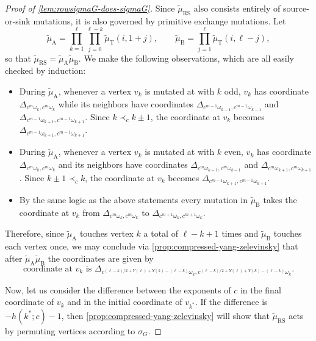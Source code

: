 \documentclass{amsart}
\theoremstyle{plain}
\theoremstyle{definition}
\theoremstyle{remark}
\newcommand{\fundamentalweight}{\omega}
\newcommand{\genminoryz}[3]{\Delta_{{#1} \fundamentalweight_{#3}, {#2}%
    \fundamentalweight_{#3}}}
\newcommand{\muint}[1]{\widetilde{\mu}_{\text{#1}}}
\newcommand{\murowperm}{\muint{RS}}
\newcommand{\muT}{\muint{T}}
\begin{document}
\begin{proof}[Proof of \cref{lem:rowsigmaG-does-sigmaG}]
    Since $\murowperm$ also consists entirely of source-or-sink
    mutations, it is also governed by primitive exchange mutations. Let
    \[ \muint{A} = \prod_{k=1}^{\ell} \prod_{j=0}^{\ell - k} \muT(i, 1 +
      j), \qquad \muint{B} = \prod_{j=1}^{\ell} \muT(i, \ell - j), \] so
    that $\murowperm = \muint{A} \muint{B}$. We make the following
    observations, which are all easily checked by induction:
    \begin{itemize}
    \item
      During $\muint{A}$, whenever a vertex $v_{k}$ is mutated at with
      $k$ odd, $v_{k}$ has coordinate $\genminoryz{c^m}{c^m}{k}$ while
      its neighbors have coordinates $\genminoryz{c^{m -
          1}}{c^{m-1}}{k-1}$ and $\genminoryz{c^{m - 1}}{c^{m-1}}{k+1}$.
      Since $k \prec_{c} k \pm 1$, the coordinate at $v_{k}$ becomes
      $\genminoryz{c^{m-1}}{c^{m-1}}{k+1}$.
    \item
      During $\muint{A}$, whenever a vertex $v_{k}$ is mutated at with
      $k$ even, $v_{k}$ has coordinate $\genminoryz{c^m}{c^m}{k}$ and
      its neighbors have coordinates $\genminoryz{c^m}{c^m}{k-1}$ and
      $\genminoryz{c^m}{c^m}{k+1}$. Since $k \pm 1 \prec_{c} k$, the
      coordinate at $v_{k}$ becomes
      $\genminoryz{c^{m-1}}{c^{m-1}}{k+1}$.
    \item
      By the same logic as the above statements every mutation in
      $\muint{B}$ takes the coordinate at $v_{k}$ from $\genminoryz{c^{m
        }}{c^{m}}{k}$ to $\genminoryz{c^{m+1}}{c^{m+1}}{k}$.
    \end{itemize}

    Therefore, since $\muint{A}$ touches vertex $k$ a total of $\ell - k
    + 1$ times and $\muint{B}$ touches each vertex once, we may conclude
    via \cref{prop:compressed-yang-zelevinsky} that after
    $\muint{A}\muint{B}$ the coordinates are given by
    \begin{equation*}
      \text{coordinate at $v_k$ is $\genminoryz{c^{(\ell - k)/2 +
            Y(\ell) + Y(k) - (\ell - k)}}{c^{(\ell - k)/2 + Y(\ell) +
            Y(k) - (\ell - k)}}{k}$.}
    \end{equation*}

    Now, let us consider the difference between the exponents of $c$ in
    the final coordinate of $v_{k}$ and in the initial coordinate of
    $v_{k^{\ast}}$. If the difference is $-h(k^{\ast};c) - 1$, then
    \cref{prop:compressed-yang-zelevinsky} will show that $\murowperm$
    acts by permuting vertices according to $\sigma_G$.


\end{proof}
\end{document}
